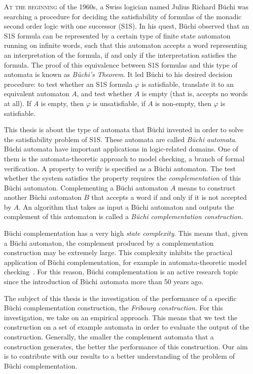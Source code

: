 \lettrine{A}{t the beginning} of the 1960s, a Swiss logician named Julius Richard Büchi was searching a procedure for deciding the satisfiability of formulas of the monadic second order logic with one successor (S1S). In his quest, Büchi observed that an S1S formula can be represented by a certain type of finite state automaton running on infinite words, such that this automaton accepts a word representing an interpretation of the formula, if and only if the interpretation satisfies the formula. The proof of this equivalence between S1S formulas and this type of automata is known as \textit{Büchi's Theorem}. It led Büchi to his desired decision procedure: to test whether an S1S formula $\varphi$ is satisfiable, translate it to an equivalent automaton $A$, and test whether $A$ is empty (that is, accepts no words at all). If $A$ is empty, then $\varphi$ is unsatisfiable, if $A$ is non-empty, then $\varphi$ is satisfiable.~\cite{buchi1960decision}

This thesis is about the type of automata that Büchi invented in order to solve the satisfiability problem of S1S. These automata are called \textit{Büchi automata}. Büchi automata have important applications in logic-related domains. One of them is the automata-theoretic approach to model checking, a branch of formal verification. A property to verify is specified as a Büchi automaton. The test whether the system satisfies the property requires the \textit{complementation} of this Büchi automaton. Complementing a Büchi automaton $A$ means to construct another Büchi automaton $B$ that accepts a word if and only if it is not accepted by $A$. An algorithm that takes as input a Büchi automaton and outputs the complement of this automaton is called a \textit{Büchi complementation construction}.

Büchi complementation has a very high \textit{state complexity}. This means that, given a Büchi automaton, the complement produced by a complementation construction may be extremely large. This complexity inhibits the practical application of Büchi complementation, for example in automata-theoretic model checking~\cite{2007_vardi_model_checking, 2007_vardi}. For this reason, Büchi complementation is an active research topic since the introduction of Büchi automata more than 50 years ago.

The subject of this thesis is the investigation of the performance of a specific Büchi complementation construction, the \textit{Fribourg construction}. For this investigation, we take on an empirical approach. This means that we test the construction on a set of example automata in order to evaluate the output of the construction. Generally, the smaller the complement automata that a construction generates, the better the performance of this construction. Our aim is to contribute with our results to a better understanding of the problem of Büchi complementation.

